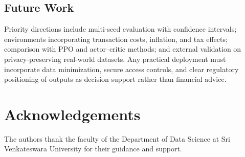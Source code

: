 \documentclass{svproc}
\begin{document}
\subsection{Future Work}

Priority directions include multi-seed evaluation with confidence intervals; environments incorporating transaction costs, inflation, and tax effects; comparison with PPO and actor--critic methods; and external validation on privacy-preserving real-world datasets. Any practical deployment must incorporate data minimization, secure access controls, and clear regulatory positioning of outputs as decision support rather than financial advice.

\section*{Acknowledgements}
The authors thank the faculty of the Department of Data Science at Sri Venkateswara University for their guidance and support.
\end{document}
